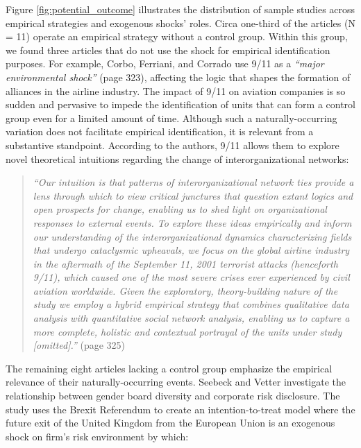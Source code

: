 \begin{refsection}
Figure \ref{fig:potential_outcome} illustrates the distribution of sample
studies across empirical strategies and exogenous shocks' roles. Circa one-third of 
the articles (N = 11) operate an empirical strategy without a control group. Within 
this group, we found three articles that do not use the shock for empirical 
identification purposes. For example, Corbo, Ferriani, and Corrado
\autocite*{corbo2016323} use 9/11 as a \textit{``major environmental shock''}
(page 323), affecting the logic that shapes the formation of alliances in the
airline industry. The impact of 9/11 on aviation companies is so sudden and
pervasive to impede the identification of units that can form a control group
even for a limited amount of time.  Although such a naturally-occurring
variation does not facilitate empirical identification, it is relevant from a
substantive standpoint. According to the authors, 9/11 allows them to explore
novel theoretical intuitions regarding the change of interorganizational
networks:

\begin{quote}
  \textit{
    ``Our intuition is that patterns of interorganizational network ties provide
    a lens through which to view critical junctures that question extant logics
    and open prospects for change, enabling us to shed light on organizational
    responses to external events.  To explore these ideas empirically and inform
    our understanding of the interorganizational dynamics characterizing fields
    that undergo cataclysmic upheavals, we focus on the global airline industry
    in the aftermath of the September 11, 2001 terrorist attacks (henceforth
    9/11), which caused one of the most severe crises ever experienced by civil
    aviation worldwide. Given the exploratory, theory-building nature of the
    study we employ a hybrid empirical strategy that combines qualitative data
    analysis with quantitative social network analysis, enabling us to capture a
    more complete, holistic and contextual portrayal of the units under study
    [omitted].''
  }
  (page 325)
\end{quote}

The remaining eight articles lacking a control group emphasize the empirical
relevance of their naturally-occurring events. Seebeck and Vetter
\autocite*{seebeck2021} investigate the relationship between gender board
diversity and corporate risk disclosure.  The study uses the Brexit Referendum
to create an intention-to-treat model where the future exit of the United
Kingdom from the European Union is an exogenous shock on firm's risk environment
by which:


\end{refsection}

